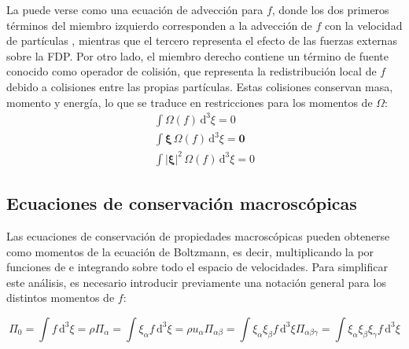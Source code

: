 La  puede verse como una ecuaci\'on de advecci\'on para $f$, donde los dos primeros t\'erminos del miembro izquierdo corresponden a la advecci\'on de $f$ con la velocidad de part\'iculas \bxi{}, mientras que el tercero representa el efecto de las fuerzas externas sobre la FDP. Por otro lado, el miembro derecho contiene un t\'ermino de fuente conocido como operador de colisi\'on, que representa la redistribuci\'on local de $f$ debido a colisiones entre las propias part\'iculas. Estas colisiones conservan masa, momento y energ\'ia, lo que se traduce en restricciones para los momentos de $\Omega$:
\begin{subequations}
	\begin{align}
		\int \Omega(f) \, \mbox{d}^3 \xi = 0 \\
		\int \bm{\xi} \, \Omega(f) \, \mbox{d}^3 \xi = \bm{0} \\		
		\int |\bm{\xi}|^2 \, \Omega(f) \, \mbox{d}^3 \xi = 0 	
	\end{align}
	\label{eq:omega_restrict}
\end{subequations}


\subsection{Ecuaciones de conservaci\'on macrosc\'opicas}
\label{sec:cons_macro}
Las ecuaciones de conservaci\'on de propiedades macrosc\'opicas pueden obtenerse como momentos de la ecuaci\'on de Boltzmann, es decir, multiplicando la  por funciones de \bxi{} e integrando sobre todo el espacio de velocidades. Para simplificar este an\'alisis, es necesario introducir previamente una notaci\'on general para los distintos momentos de $f$:

\begin{subequations}
	\begin{equation}
		\Pi_0 = \int f \, \mbox{d}^3 \xi = \rho
	\end{equation}
	\begin{equation}
		\Pi_{\alpha} = \int \xi_{\alpha} f \, \mbox{d}^3 \xi = \rho u_{\alpha}
	\end{equation}
	\begin{equation}
		\Pi_{\alpha \beta} = \int \xi_{\alpha} \xi_{\beta} f \, \mbox{d}^3 \xi
	\end{equation}
	\begin{equation}
		\Pi_{\alpha \beta \gamma} = \int \xi_{\alpha} \xi_{\beta} \xi_{\gamma} f \, \mbox{d}^3 \xi
	\end{equation}
	\label{eq:f_moments}
\end{subequations}

